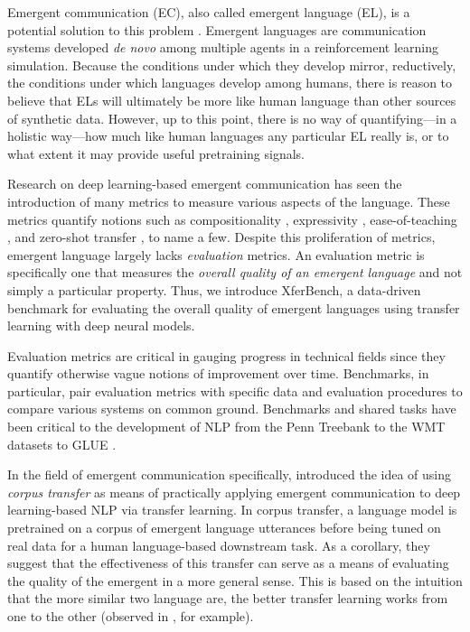 Emergent communication (EC), also called emergent language (EL), is a potential solution to this problem \citep{yao2022linking,downey-etal-2023-learning,mu2023ec2}.
Emergent languages are communication systems developed \textit{de novo} among multiple agents in a reinforcement learning simulation.
Because the conditions under which they develop mirror, reductively, the conditions under which languages develop among humans, there is reason to believe that ELs will ultimately be more like human language than other sources of synthetic data.
However, up to this point, there is no way of quantifying---in a holistic way---how much like human languages any particular EL really is, or to what extent it may provide useful pretraining signals.


Research on deep learning-based emergent communication has seen the introduction of many metrics to measure various aspects of the language.
These metrics quantify notions such as compositionality \citep{Brighton2006UnderstandingLE,Lazaridou2018EmergenceOL}, expressivity \citep{guo2023emergent}, ease-of-teaching \citep{li2019ease}, and zero-shot transfer \citep{Bullard2020ExploringZE}, to name a few.
Despite this proliferation of metrics, emergent language largely lacks \emph{evaluation} metrics.
An evaluation metric is specifically one that measures the \emph{overall quality of an emergent language} and not simply a particular property.
Thus, we introduce XferBench, a data-driven benchmark for evaluating the overall quality of emergent languages using transfer learning with deep neural models.

Evaluation metrics are critical in gauging progress in technical fields since they quantify otherwise vague notions of improvement over time.
Benchmarks, in particular, pair evaluation metrics with specific data and evaluation procedures to compare various systems on common ground.
Benchmarks and shared tasks have been critical to the development of NLP from the Penn Treebank \citep{Marcus1993BuildingAL} to the WMT datasets \citep{bojar2014wmt} to GLUE \citep{Wang2018GLUEAM}.

In the field of emergent communication specifically,
  \citet{yao2022linking} introduced the idea of using \emph{corpus transfer} as means of practically applying emergent communication to deep learning-based NLP via transfer learning.
In corpus transfer, a language model is pretrained on a corpus of emergent language utterances before being tuned on real data for a human language-based downstream task.
As a corollary, they suggest that the effectiveness of this transfer can serve as a means of evaluating the quality of the emergent in a more general sense.
This is based on the intuition that the more similar two language are, the better transfer learning works from one to the other (observed in \citet{zoph-etal-2016-transfer}, for example).

